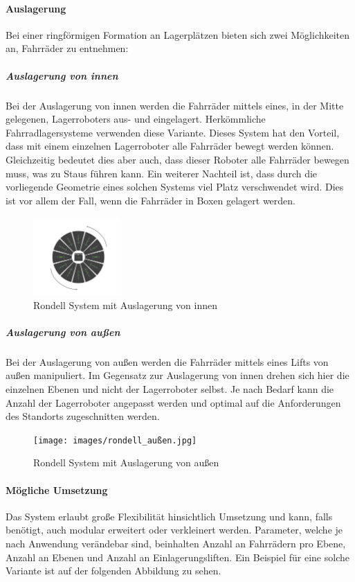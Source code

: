 \clearpage
\paragraph{Auslagerung} Bei einer ringförmigen Formation an Lagerplätzen bieten sich zwei Möglichkeiten an, Fahrräder zu entnehmen:

\subparagraph{Auslagerung von innen} Bei der Auslagerung von innen werden die Fahrräder mittels eines, in der Mitte gelegenen, Lagerroboters aus- und eingelagert. Herkömmliche Fahrradlagersysteme verwenden diese Variante. Dieses System hat den Vorteil, dass mit einem einzelnen Lagerroboter alle Fahrräder bewegt werden können. Gleichzeitig bedeutet dies aber auch, dass dieser Roboter alle Fahrräder bewegen muss, was zu Staus führen kann. Ein weiterer Nachteil ist, dass durch die vorliegende Geometrie eines solchen Systems viel Platz verschwendet wird. Dies ist vor allem der Fall, wenn die Fahrräder in Boxen gelagert werden.

\begin{figure}[H]
  \centering
  \includegraphics[width=0.3\textwidth]{images/rondell_innen.jpg}
  \caption{Rondell System mit Auslagerung von innen}
  \label{fig:rondell_innen}
\end{figure}

\subparagraph{Auslagerung von außen} Bei der Auslagerung von außen werden die Fahrräder mittels eines Lifts von außen manipuliert. Im Gegensatz zur Auslagerung von innen drehen sich hier die einzelnen Ebenen und nicht der Lagerroboter selbst. Je nach Bedarf kann die Anzahl der Lagerroboter angepasst werden und optimal auf die Anforderungen des Standorts zugeschnitten werden.

\begin{figure}[H]
  \centering
  \texttt{[image: images/rondell\_außen.jpg]}
  \caption{Rondell System mit Auslagerung von außen}
  \label{fig:rondell_außen}
\end{figure}

\clearpage
\paragraph{Mögliche Umsetzung} Das System erlaubt große Flexibilität hinsichtlich Umsetzung und kann, falls benötigt, auch modular erweitert oder verkleinert werden. Parameter, welche je nach Anwendung verändebar sind, beinhalten Anzahl an Fahrrädern pro Ebene, Anzahl an Ebenen und Anzahl an Einlagerungsliften. Ein Beispiel für eine solche Variante ist auf der folgenden Abbildung zu sehen.

